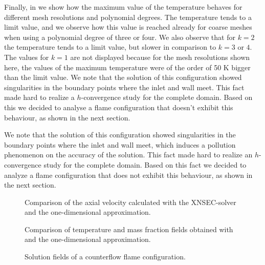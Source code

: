 Finally, in  we show how the maximum value of the temperature behaves for different mesh resolutions and polynomial degrees. The temperature tends to a limit value, and we observe how this value is reached already for coarse meshes when using a polynomial degree of three or four. We also observe that for $k=2$ the temperature tends to a limit value, but slower in comparison to $k =3$ or $4$. The values for $k=1$ are not displayed because for the mesh resolutions shown here, the values of the maximum temperature were of the order of 50 \si{K} bigger than the limit value. We note that the solution of this configuration showed singularities in the boundary points where the inlet and wall meet. This fact made hard to realize a $h$-convergence study for the complete domain. Based on this we decided to analyse a flame configuration that doesn't exhibit this behaviour, as shown in the next section.

We note that the solution of this configuration showed singularities in the boundary points where the inlet and wall meet, which induces a pollution phenomenon on the accuracy of the solution. This fact made hard to realize an $h$-convergence study for the complete domain. Based on this fact we decided to analyze a flame configuration that does not exhibit this behaviour, as shown in the next section.
\begin{figure}[t!]
	\centering
	\caption{Comparison of the axial velocity calculated with the XNSEC-solver and the one-dimensional approximation.}
	\label{fig:BoSSS_1D_Comparison_velocity}
\end{figure}
\newpage
\tikzexternaldisable
\begin{figure}[b!]
	\centering
	\caption{Comparison of temperature and mass fraction fields obtained with \BoSSS and the one-dimensional approximation.}
	\label{fig:BoSSS_1D_Comparison}
\end{figure}
\tikzexternalenable
\newpage
\begin{figure}[t]
	\centering
	\pgfplotsset{width=0.81\textwidth, compat=1.3}
	\caption{Solution fields of a counterflow flame configuration.} \label{fig:CoFlowFlameFig1}
\end{figure}

